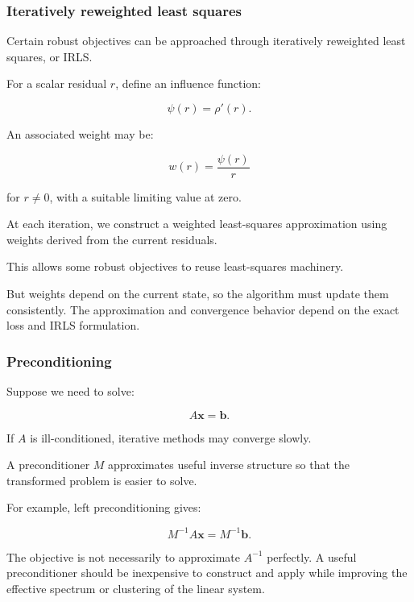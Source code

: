 \subsubsection{Iteratively reweighted least squares}\label{02-foundations-ii-ch028-iteratively-reweighted-least-squares}

\hypertarget{02-foundations-ii-ch028-iteratively-reweighted-least-squares}{}

Certain robust objectives can be approached through iteratively reweighted least squares, or IRLS.

For a scalar residual \(r\), define an influence function:

\[
\psi(r)=\rho'(r).
\]

An associated weight may be:

\[
w(r)=\frac{\psi(r)}r
\]

for \(r\ne0\), with a suitable limiting value at zero.

At each iteration, we construct a weighted least-squares approximation using weights derived from the current residuals.

This allows some robust objectives to reuse least-squares machinery.

But weights depend on the current state, so the algorithm must update them consistently. The approximation and convergence behavior depend on the exact loss and IRLS formulation.

\subsubsection{Preconditioning}\label{02-foundations-ii-ch028-preconditioning}

\hypertarget{02-foundations-ii-ch028-preconditioning}{}

Suppose we need to solve:

\[
A\mathbf x=\mathbf b.
\]

If \(A\) is ill-conditioned, iterative methods may converge slowly.

A preconditioner \(M\) approximates useful inverse structure so that the transformed problem is easier to solve.

For example, left preconditioning gives:

\[
M^{-1}A\mathbf x=M^{-1}\mathbf b.
\]

The objective is not necessarily to approximate \(A^{-1}\) perfectly. A useful preconditioner should be inexpensive to construct and apply while improving the effective spectrum or clustering of the linear system.

